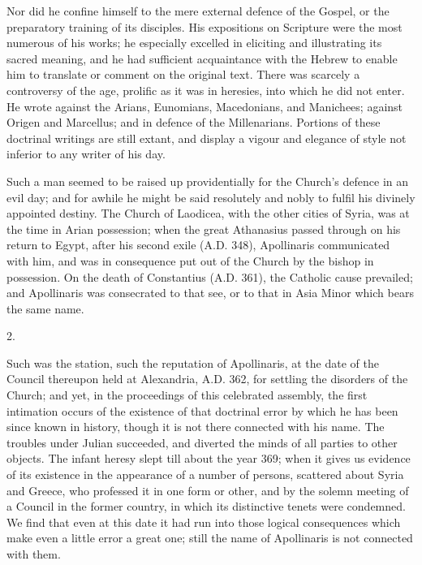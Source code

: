 Nor did he confine himself to the mere external defence of the
Gospel, or the preparatory training of its disciples. His expositions
on Scripture were the most numerous of his works; he especially
excelled in eliciting and illustrating its sacred meaning, and he had
sufficient acquaintance with the Hebrew to enable him to translate or
comment on the original text. There was scarcely a controversy of the
age, prolific as it was in heresies, into which he did not enter. He
wrote against the Arians, Eunomians, Macedonians, and Manichees;
against Origen and Marcellus; and in defence of the Millenarians.
Portions of these doctrinal writings are still extant, and display a
vigour and elegance of style not inferior to any writer of his day.

Such a man seemed to be raised up providentially for the Church's
defence in an evil day; and for awhile he might be said resolutely and
nobly to fulfil his divinely appointed destiny. The Church of Laodicea,
with the other cities of Syria, was at the time in Arian
possession; when the great Athanasius passed through on his return to
Egypt, after his second exile (A.D. 348),
Apollinaris communicated with him, and was in consequence put out of
the Church by the bishop in possession. On the death of Constantius (A.D.
361), the Catholic cause prevailed; and Apollinaris was consecrated to
that see, or to that in Asia Minor which bears the same name.

2.

Such was the station, such the reputation of Apollinaris, at the
date of the Council thereupon held at Alexandria, A.D.
362, for settling the disorders of the Church; and yet, in the
proceedings of this celebrated assembly, the first intimation occurs
of the existence of that doctrinal error by which he has been since
known in history, though it is not there connected with his name. The
troubles under Julian succeeded, and diverted the minds of all parties
to other objects. The infant heresy slept till about the year 369;
when it gives us evidence of its existence in the appearance of a
number of persons, scattered about Syria and Greece, who professed it
in one form or other, and by the solemn meeting of a Council in the
former country, in which its distinctive tenets were condemned. We
find that even at this date it had run into those logical consequences
which make even a little error a great one; still the name of
Apollinaris is not connected with them.

